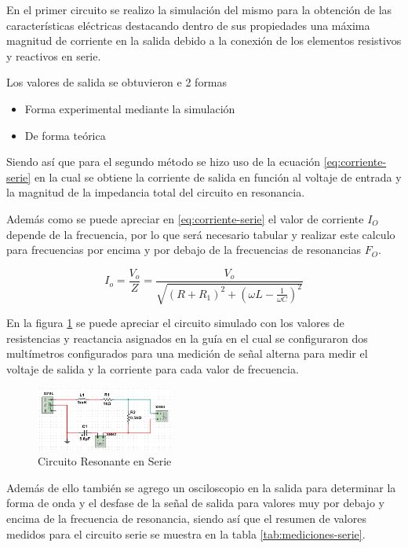 \documentclass[conference]{IEEEtran}
\begin{document}
	En el primer circuito se realizo la simulación del mismo para la obtención de las características eléctricas destacando dentro de sus propiedades una máxima magnitud de corriente en la salida debido a la conexión de los elementos resistivos y reactivos en serie.
	
	Los valores de salida se obtuvieron e 2 formas
	\begin{itemize}
		\item Forma experimental mediante la simulación 
		\item De forma teórica
	\end{itemize}
	
	Siendo así que para el segundo método se hizo uso de la ecuación \ref{eq:corriente-serie} en la cual se obtiene la corriente de salida en función al voltaje de entrada y la magnitud de la impedancia total del circuito en resonancia.
	
	Además como se puede apreciar en \ref{eq:corriente-serie} el valor de corriente $I_O$ depende de la frecuencia, por lo que será necesario tabular y realizar este calculo para frecuencias por encima y por debajo de la frecuencias de resonancias $F_O$.
	
	\begin{equation}
		I_o = \frac{V_o}{Z} = \frac{V_o}{\sqrt{(R + R_1)^2 + (\omega L - \frac{1}{\omega C})^2}}
		\label{eq:corriente-serie}
	\end{equation}
	
	En la figura \ref{fig:circuito-serie} se puede apreciar el circuito simulado con los valores de resistencias y reactancia asignados en la guía en el cual se configuraron dos multímetros configurados para una medición de señal alterna para medir el voltaje de salida y la corriente para cada valor de frecuencia.
	
	\begin{figure}[h]
		\centering
		\includegraphics[width=0.4\textwidth]{media/circuito-serie}
		\caption{Circuito Resonante en Serie}
		\label{fig:circuito-serie}
	\end{figure}
	
	Además de ello también se agrego un osciloscopio en la salida para determinar la forma de onda y el desfase de la señal de salida para valores muy por debajo y encima de la frecuencia de resonancia, siendo así que el resumen de valores medidos para el circuito serie se muestra en la tabla \ref{tab:mediciones-serie}.
	
\end{document}
